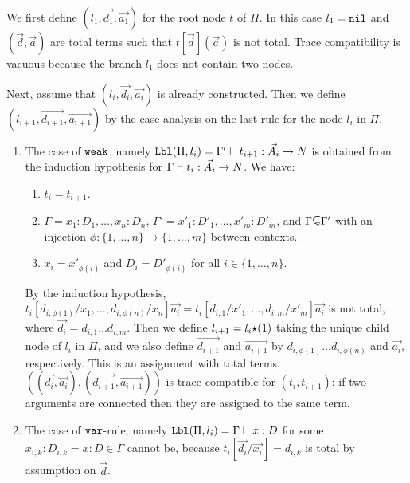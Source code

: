 \documentclass{article}
\newenvironment{proof}[1][Proof]{\begin{trivlist}
\item[\hskip \labelsep {\bfseries #1}]}{\end{trivlist}}
\begin{document}
\begin{proof}
  We first define $(l_1,\vec{d_1},\vec{a_1})$ for the root node $t$ of $\Pi$.
  In this case $l_1 = {\tt nil}$ 
   and $(\vec{d},\vec{a})$ are total terms such that $t[\vec{d}](\vec{a})$ is not total.
  Trace compatibility is vacuous because the branch $l_1$ does not contain two nodes.

  Next, assume that $(l_i,\vec{d_i},\vec{a_i})$ is already constructed.
  Then we define $(l_{i+1},\vec{d_{i+1}},\vec{a_{i+1}})$ by the case analysis on
  the last rule for the node $l_i$ in $\Pi$. 




\begin{enumerate}

\item
  The case of ${\tt weak}$, namely
  ${\tt Lbl}(\Pi,l_i) = \Gamma'\vdash t_{i+1}:\vec{A_i}\rightarrow{N}$
  is obtained from the induction hypothesis for
  $\Gamma\vdash t_{i}:\vec{A_i}\rightarrow{N}$. We have:

\begin{enumerate}
\item
 $t_i = t_{i+1}$. 
\item
  $\Gamma = x_1:D_1,\ldots,x_n:D_n$, $\Gamma' = x'_1:D'_1,\ldots,x'_m:D'_m$, and $\Gamma \subseteqsim \Gamma'$
  with an injection $\phi:\{1,\ldots,n\}\to\{1,\ldots,m\}$ between contexts. 
\item
  $x_i = x'_{\phi(i)}$ and $D_i = D'_{\phi(i)}$ for all $i \in \{1,\ldots,n\}$.
\end{enumerate}

  By the induction hypothesis, 
  $t_i[d_{i,\phi(1)}/x_1,\ldots,d_{i,\phi(n)}/x_n]\vec{a_i} 
   = t_i[d_{i,1}/x'_1,\ldots,d_{i,m}/x'_m]\vec{a_i}$ is not total,
  where $\vec{d_i} = d_{i,1}\ldots d_{i,m}$.
  Then we define $l_{i+1} = l_i{\star}(1)$ taking the unique child node of $l_i$ in $\Pi$, and we
  also define $\vec{d_{i+1}}$ and $\vec{a_{i+1}}$ by $d_{i,\phi(1)}\ldots d_{i,\phi(n)}$
  and $\vec{a_i}$, respectively. This is an assignment with total terms.
  $((\vec{d_i},\vec{a_i}),(\vec{d_{i+1}},\vec{a_{i+1}}))$
  is trace compatible for $(t_i,t_{i+1})$: if two arguments are connected then they are assigned
  to the same term. 

\item
  The case of ${\tt var}$-rule, namely ${\tt Lbl}(\Pi,l_i) = \Gamma\vdash x:D$ for some $x_{i,k}:D_{i,k} = x:D \in \Gamma$
  cannot be, because $t_i [\vec{d_i}/\vec{x_i}] = d_{i,k}$ is total  by assumption on $\vec{d}$.
  

\end{enumerate}
\end{proof}
\end{document}
